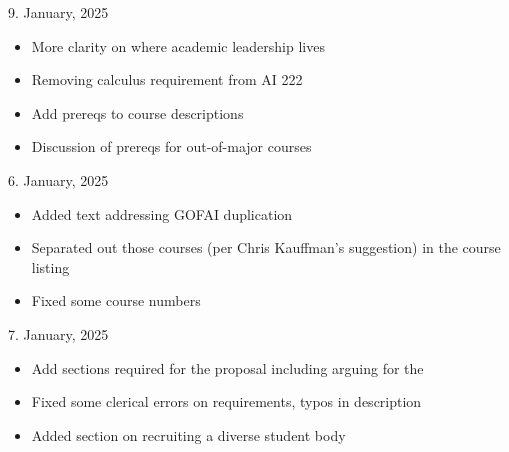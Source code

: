 9. January, 2025

\begin{itemize}
  \item More clarity on where academic leadership lives
  \item Removing calculus requirement from AI 222
  
  \item Add prereqs to course descriptions
  \item Discussion of prereqs for out-of-major courses
\end{itemize}

6. January, 2025

\begin{itemize}
    \item Added text addressing GOFAI duplication
    \item Separated out those courses (per Chris Kauffman's suggestion) in the course listing
    \item Fixed some course numbers
\end{itemize}

7. January, 2025

\begin{itemize}
    \item Add sections required for the  proposal including arguing for the 
    \item Fixed some clerical errors on requirements, typos in description
    \item Added section on recruiting a diverse student body
\end{itemize}

